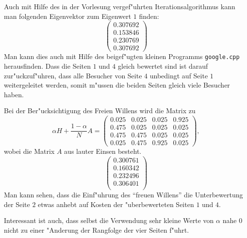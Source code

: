 \begin{loesung}
\begin{teilaufgaben}
Auch mit Hilfe des in der Vorlesung vergef"uhrten Iterationsalgorithmus
kann man folgenden Eigenvektor zum Eigenwert $1$ finden:
\[
\begin{pmatrix}
0.307692\\
0.153846\\
0.230769\\
0.307692
\end{pmatrix}
\]
Man kann dies auch mit Hilfe des beigef"ugten kleinen Programms
{\tt google.cpp} herausfinden.
Dass die Seiten $1$ und $4$ gleich bewertet sind ist darauf zur"uckzuf"uhren,
dass alle Besucher von Seite $4$ unbedingt auf Seite $1$ weitergeleitet
werden, somit m"ussen die beiden Seiten gleich viele Besucher haben.
\item
Bei der Ber"ucksichtigung des Freien Willens wird die Matrix zu
\[
\alpha H+\frac{1-\alpha}N A
=
\left(\begin{matrix}
0.025&0.025&0.025&0.925\\
0.475&0.025&0.025&0.025\\
0.475&0.475&0.025&0.025\\
0.025&0.475&0.925&0.025
\end{matrix}\right),
\]
wobei die Matrix $A$ aus lauter Einsen besteht.
\[
\left(\begin{matrix}
0.300761\\
0.160342\\
0.232496\\
0.306401\\
\end{matrix}\right)
\]
Man kann sehen, dass die Einf"uhrung des ``freuen Willens'' die
Unterbewertung der Seite $2$ etwas anhebt auf Kosten der
"uberbewerteten Seiten $1$ und $4$.

Interessant ist auch, dass selbst die Verwendung sehr kleine Werte von
$\alpha$ nahe $0$ nicht zu einer "Anderung der Rangfolge der vier
Seiten f"uhrt.
\end{teilaufgaben}
\end{loesung}

